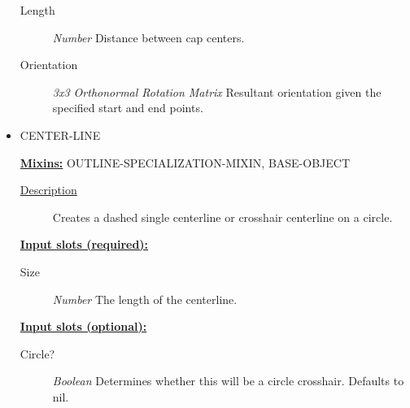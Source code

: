 \documentclass [11pt]{book}
\begin{document}
\begin{itemize}
\begin{description}
\item [Length]
\emph{Number} Distance between cap centers.


\item [Orientation]
\emph{3x3 Orthonormal Rotation Matrix} Resultant orientation given the specified start and end points.


\end{description}







\item {}CENTER-LINE


\textbf{
\underline{Mixins:}} OUTLINE-SPECIALIZATION-MIXIN, BASE-OBJECT





\begin{description}

\item [
\underline{Description}]


Creates a dashed single centerline or crosshair centerline on a circle.



\end{description}








\textbf{
\underline{Input slots (required):}}

\begin{description}

\item [Size]
\emph{Number} The length of the centerline.


\end{description}






\textbf{
\underline{Input slots (optional):}}

\begin{description}

\item [Circle?]
\emph{Boolean} Determines whether this will be a circle crosshair. Defaults to nil.


\end{description}







\end{itemize}
\end{document}
